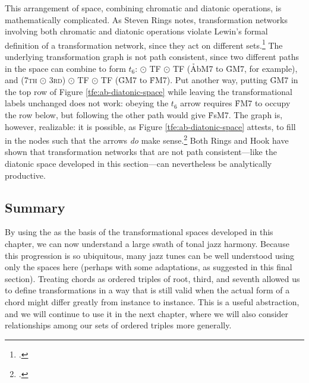 This arrangement of \tf space, combining chromatic and diatonic operations, is
mathematically complicated. As Steven Rings notes, transformation networks
involving both chromatic and diatonic operations violate Lewin's formal
definition of a transformation network, since they act on different
sets.\footcite[98--99]{rings:2011} The underlying transformation graph is not
path consistent, since two different paths in the space can combine to form
$t_6$: \slideS $\odot$ TF $\odot$ TF (\h{AbM7} to \h{GM7}, for example), and
(\textsc{7th} $\odot$ \textsc{3rd}) $\odot$ TF $\odot$ TF (\h{GM7} to
\h{FM7}). Put another way, putting \h{GM7} in the top row of Figure
\ref{tfe:ab-diatonic-space} while leaving the transformational labels
unchanged does not work: obeying the $t_6$ arrow requires
\h{FM7} to occupy the row below, but following the other path would give
\h{FsM7}. The graph is, however, realizable: it is possible, as Figure
\ref{tfe:ab-diatonic-space} attests, to fill in the nodes such that the arrows
\emph{do} make sense.\footcite[29]{hook:2007} Both Rings and Hook have shown
that transformation networks that are not path consistent---like the diatonic
\tf space developed in this section---can nevertheless be analytically
productive.

\subsection{Summary}

By using the \tfo as the basis of the transformational spaces developed in
this chapter, we can now understand a large swath of tonal jazz harmony.
Because this progression is so ubiquitous, many jazz tunes can be well
understood using only the spaces here (perhaps with some adaptations, as
suggested in this final section). Treating chords as ordered triples of root,
third, and seventh allowed us to define transformations in a way that is still
valid when the actual form of a chord might differ greatly from instance to
instance. This is a useful abstraction, and we will continue to use it in the
next chapter, where we will also consider relationships among our sets of
ordered triples more generally.


